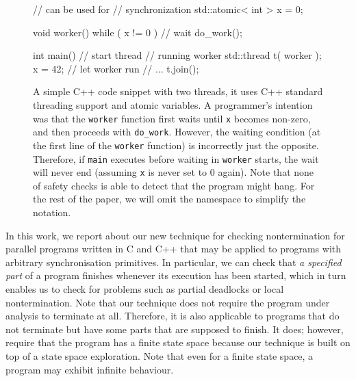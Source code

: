 \begin{figure}[t]
\begin{minipage}[t]{0.49\textwidth}
\begin{cppcode}
    // can be used for
    // synchronization
    std::atomic< int > x = 0;

    void worker() {
      while ( x != 0 ) { } // wait
      do_work();
    }
\end{cppcode}
\end{minipage}
\hfill%
\begin{minipage}[t]{0.49\textwidth}
\begin{cppcode}
    int main() {
      // start thread
      // running worker
      std::thread t( worker );
      x = 42; // let worker run
      // ...
      t.join();
    }
\end{cppcode}
\end{minipage}
\caption{
A simple C++ code snippet with two threads, it uses C++ standard threading support and atomic variables.
A programmer's intention was that the \texttt{worker} function first waits until \texttt{x}
becomes non-zero, and then proceeds with \texttt{do\_work}. However, the waiting
condition (at the first line of the \texttt{worker} function) is incorrectly just the
opposite. Therefore, if \texttt{main} executes  before waiting in \texttt{worker} starts, the wait will never end (assuming \texttt{x} is never set to 0 again).
Note that none of safety checks is able to detect that the program might hang.
For the rest of the paper, we will omit the  namespace to
simplify the notation.
}\label{fig:livelock0}
\end{figure}

In this work, we report about our new technique for checking nontermination for parallel programs written in C and C++ that may be applied to programs with arbitrary synchronisation primitives.
In particular, we can check that \emph{a specified part} of a program finishes
whenever its execution has been started, which in turn enables us to check for problems such as partial deadlocks or local nontermination.
Note that our technique does not require the program under analysis to terminate at all.
Therefore, it is also applicable to programs that do not terminate but have some
parts that are supposed to finish.
It does; however, require that the program has a finite state space because our
technique is built on top of a state space exploration. Note that even for a finite state space, a program may exhibit infinite behaviour.

